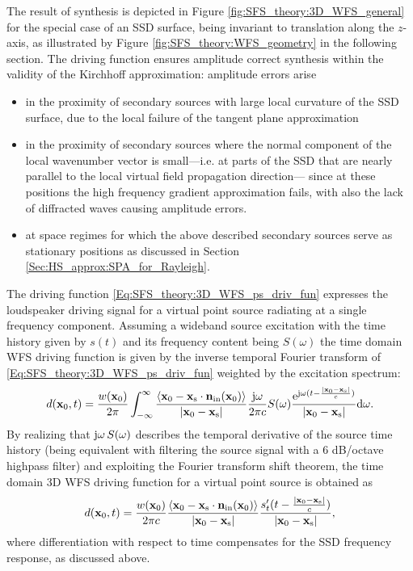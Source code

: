 The result of synthesis is depicted in Figure \ref{fig:SFS_theory:3D_WFS_general} for the special case of an SSD surface, being invariant to translation along the $z$-axis, as illustrated by Figure \ref{fig:SFS_theory:WFS_geometry} in the following section.
The driving function ensures amplitude correct synthesis within the validity of the Kirchhoff approximation:
amplitude errors arise 
\begin{itemize}
\item in the proximity of secondary sources with large local curvature of the SSD surface, due to the local failure of the tangent plane approximation
\item in the proximity of secondary sources where the normal component of the local wavenumber vector is small---i.e. at parts of the SSD that are nearly parallel to the local virtual field propagation direction--- since at these positions the high frequency gradient approximation fails, with also the lack of diffracted waves causing amplitude errors.
\item at space regimes for which the above described secondary sources serve as stationary positions as discussed in Section \ref{Sec:HS_approx:SPA_for_Rayleigh}.
\end{itemize}

The driving function \eqref{Eq:SFS_theory:3D_WFS_ps_driv_fun} expresses the loudspeaker driving signal for a virtual point source radiating at a single frequency component.
Assuming a wideband source excitation with the time history given by $s(t)$ and its frequency content being $S(\omega)$ the time domain WFS driving function is given by the inverse temporal Fourier transform of \eqref{Eq:SFS_theory:3D_WFS_ps_driv_fun} weighted by the excitation spectrum:
\begin{equation}
d(\mathbf{x}_0,t) = \frac{w(\mathbf{x}_0)}{2\pi} \int_{-\infty}^{\infty} \frac{\left< \mathbf{x}_0-\mathbf{x}_{\mathrm{s}} \cdot \mathbf{n}_{\mathrm{in}}(\mathbf{x}_0) \right> }{|\mathbf{x}_0-\mathbf{x}_{\mathrm{s}}|} \frac{\mathrm{j} \omega }{2\pi c} S(\omega) \frac{\mathrm{e}^{ \mathrm{j} \omega ( t - \frac{|\mathbf{x}_0-\mathbf{x}_{\mathrm{s}}|}{c} ) }}{|\mathbf{x}_0-\mathbf{x}_{\mathrm{s}}|} 
\mathrm{d} \omega.
\end{equation}
By realizing that $\mathrm{j} \omega \, S(\omega)$ describes the temporal derivative of the source time history (being equivalent with filtering the source signal with a 6 dB/octave highpass filter) and exploiting the Fourier transform shift theorem, the time domain 3D WFS driving function for a virtual point source is obtained as
\begin{equation}
\label{Eq:SFS_theory:3D_WFS_ps_driv_fun_td}
d(\mathbf{x}_0,t) = \frac{w(\mathbf{x}_0)}{2\pi c} \frac{\left< \mathbf{x}_0-\mathbf{x}_{\mathrm{s}} \cdot \mathbf{n}_{\mathrm{in}}(\mathbf{x}_0) \right> }{|\mathbf{x}_0-\mathbf{x}_{\mathrm{s}}|} \frac{s'_t(t - \frac{|\mathbf{x}_0-\mathbf{x}_{\mathrm{s}}|}{c} )}{|\mathbf{x}_0-\mathbf{x}_{\mathrm{s}}|},
\end{equation}
where differentiation with respect to time compensates for the SSD frequency response, as discussed above.

